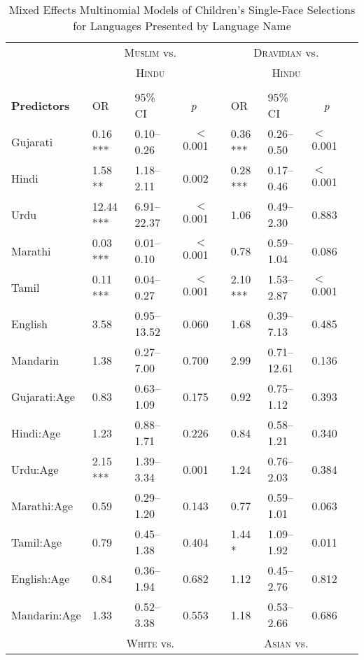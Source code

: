 \begin{table}[ht]
\small
\caption{Mixed Effects Multinomial Models of Children's Single-Face Selections for Languages Presented by Language Name}\label{tab:flmod}
    \centering
    \vspace{5pt}
    \setlength{\tabcolsep}{1.75pt} 
\begin{threeparttable}
\begin{tabular}{lllrllllr}
 \toprule
& \multicolumn{3}{c}{\textsc{Muslim} vs.} & & \multicolumn{3}{c}{\textsc{Dravidian} vs.}\\
& \multicolumn{3}{c}{\textsc{Hindu}\tnote{a}} & & \multicolumn{3}{c}{\textsc{Hindu}\tnote{a}}\\
\cline{2-4} \cline{6-8} \\[-.75em]
\textbf{Predictors} & OR & 95\% CI & \multicolumn{1}{c}{\textit{p}} & & OR & 95\% CI & \multicolumn{1}{c}{\textit{p}} \\ 
\midrule
Gujarati & 0.16 *** & 0.10--0.26 & $<$0.001 &  & 0.36 *** & 0.26--0.50 & $<$0.001 \\ 
Hindi & 1.58 ** & 1.18--2.11 & 0.002 &  & 0.28 *** & 0.17--0.46 & $<$0.001 \\ 
Urdu & 12.44 *** & 6.91--22.37 & $<$0.001 &  & 1.06 & 0.49--2.30 & 0.883 \\ 
Marathi & 0.03 *** & 0.01--0.10 & $<$0.001 &  & 0.78 & 0.59--1.04 & 0.086 \\ 
Tamil & 0.11 *** & 0.04--0.27 & $<$0.001 &  & 2.10 *** & 1.53--2.87 & $<$0.001 \\ 
English & 3.58 & 0.95--13.52 & 0.060 &  & 1.68 & 0.39--7.13 & 0.485 \\ 
Mandarin & 1.38 & 0.27--7.00 & 0.700 &  & 2.99 & 0.71--12.61 & 0.136 \\ 
Gujarati:Age\tnote{b} & 0.83 & 0.63--1.09 & 0.175 &  & 0.92 & 0.75--1.12 & 0.393 \\ 
Hindi:Age\tnote{b} & 1.23 & 0.88--1.71 & 0.226 &  & 0.84 & 0.58--1.21 & 0.340 \\ 
Urdu:Age\tnote{b} & 2.15 *** & 1.39--3.34 & 0.001 &  & 1.24 & 0.76--2.03 & 0.384 \\ 
Marathi:Age\tnote{b} & 0.59 & 0.29--1.20 & 0.143 &  & 0.77 & 0.59--1.01 & 0.063 \\ 
Tamil:Age\tnote{b} & 0.79 & 0.45--1.38 & 0.404 &  & 1.44 * & 1.09--1.92 & 0.011 \\ 
English:Age\tnote{b} & 0.84 & 0.36--1.94 & 0.682 &  & 1.12 & 0.45--2.76 & 0.812 \\ 
Mandarin:Age\tnote{b} & 1.33 & 0.52--3.38 & 0.553 &  & 1.18 & 0.53--2.66 & 0.686 \\ 
 \midrule
& 
\multicolumn{3}{c}{\textsc{White} vs.} & &
\multicolumn{3}{c}{\textsc{Asian} vs.}\\


\end{tabular}
\end{threeparttable}
\end{table}
